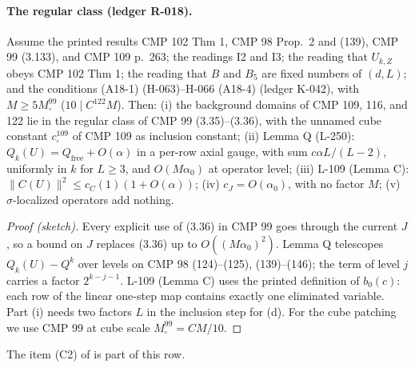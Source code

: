 \paragraph{The regular class (ledger R-018).}
\begin{proposition}\label{prop:L033}
Assume the printed results CMP 102 Thm 1, CMP 98 Prop.\ 2 and (139), CMP 99 (3.133), and CMP 109 p.~263; the readings I2 and I3; the reading that $U_{k,Z}$ obeys CMP 102 Thm 1; the reading that $B$ and $B_5$ are fixed numbers of $(d,L)$; and the conditions (A18-1) (H-063)--H-066 (A18-4) (ledger K-042), with $M\ge5M_\square^{99}$ ($10\mid C^{122}M$). Then: (i) the background domains of CMP 109, 116, and 122 lie in the regular class of CMP 99 (3.35)--(3.36), with the unnamed cube constant $c_\square^{109}$ of CMP 109 as inclusion constant; (ii) Lemma Q (L-250): $Q_k(U)=Q_{\mathrm{free}}+O(\alpha)$ in a per-row axial gauge, with sum $c\alpha L/(L-2)$, uniformly in $k$ for $L\ge3$, and $O(M\alpha_0)$ at operator level; (iii) L-109 (Lemma C): $\|C(U)\|^2\le c_C(1)(1+O(\alpha))$; (iv) $c_J=O(\alpha_0)$, with no factor $M$; (v) $\sigma$-localized operators add nothing.
\end{proposition}
\begin{proof}[Proof (sketch)]
Every explicit use of (3.36) in CMP 99 goes through the current $J$, so a bound on $J$ replaces (3.36) up to $O((M\alpha_0)^2)$. Lemma Q telescopes $Q_k(U)-Q^k$ over levels on CMP 98 (124)--(125), (139)--(146); the term of level $j$ carries a factor $2^{k-j-1}$. L-109 (Lemma C) uses the printed definition of $b_0(c)$: each row of the linear one-step map contains exactly one eliminated variable. Part (i) needs two factors $L$ in the inclusion step for (d). For the cube patching we use CMP 99 at cube scale $M_\square^{99}=CM/10$.
\end{proof}
The item (C2) of  is part of this row.

